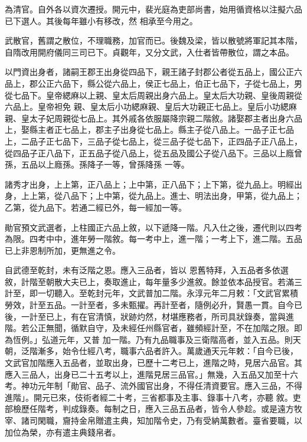 \begin{pinyinscope}
 為清官。自外各以資次遷授。開元中，裴光庭為吏部尚書，始用循資格以注擬六品已下選人。其後每年雖小有移改，然
 相承至今用之。



 武散官，舊謂之散位，不理職務，加官而已。後魏及梁，皆以散號將軍記其本階，自隋改用開府儀同三司已下。貞觀年，又分文武，入仕者皆帶散位，謂之本品。



 以門資出身者，諸嗣王郡王出身從四品下，親王諸子封郡公者從五品上，國公正六品上，郡公正六品下，縣公從六品上，侯正七品上，伯正七品下，子從七品上，男從七品下。皇帝緦麻以上親、皇太后周親出身六品上。皇太后大功親、皇後周親從六品上。皇帝袒免
 親、皇太后小功緦麻親、皇后大功親正七品上。皇后小功緦麻親、皇太子妃周親從七品上。其外戚各依服屬降宗親二階敘。諸娶郡主者出身六品上，娶縣主者正七品上，郡主子出身從七品上。縣主子從八品上。一品子正七品上，二品子正七品下，三品子從七品上，從三品子從七品下，正四品子正八品上，從四品子正八品下，正五品子從八品上，從五品及國公子從八品下。三品以上廕曾孫，五品以上廕孫。孫降子一等，曾孫降孫
 一等。



 諸秀才出身，上上第，正八品上；上中第，正八品下；上下第，從九品上。明經出身，上上第，從八品下；上中第，從九品上。進士、明法出身，甲第，從九品上；乙第，從九品下。若通二經已外，每一經加一等。



 勛官預文武選者，上柱國正六品上敘，以下遞降一階。凡入仕之後，遷代則以四考為限。四考中中，進年勞一階敘。每一考中上，進一階；一考上下，進二階。五品已上非恩制所加，更無進之令。



 自武德至乾封，未有泛階之恩。應入三品者，皆以
 恩舊特拜，入五品者多依選敘，計階至朝散大夫已上，奏取進止，每年量多少進敘。餘並依本品授官。若滿三計至，即一切聽入。至乾封元年，文武普加二階。永淳元年二月敕：「文武官累積勞效，計至五品。一計至者，多未甄擢。再計至者，隨例必升，賢愚一貫。自今已後，一計至已上，有在官清慎，狀跡灼然，材堪應務者，所司具狀錄奏，當與進階。若公正無聞，循默自守，及未經任州縣官者，雖頻經計至，不在加階之限。即為恆例。」弘道元年，又普
 加一階。乃有九品職事及三衛階高者，並入五品。則天朝，泛階漸多，始令仕經八考，職事六品者許入。萬歲通天元年敕：「自今已後，文武官加階應入五品者，並取出身，已歷十二考已上，進階之時，見居六品官。其應入三品人，出身已二十五考以上，進階見居三品官。」無幾，入五品又加至十六考。神功元年制「勛官、品子、流外國官出身，不得任清資要官。應入三品，不得進階」。開元已來，伎術者經二十考，三省都事及主事、錄事十八考，亦聽
 敘。吏部檢歷任階考，判成錄奏。每制之日，應入三品五品者，皆令人參趁。或是遠方牧宰、諸司閑職，齎持金帛贈遣主典，知加階令史，乃有受納萬數者。臺省要職，以加位為榮，亦有遣主典錢帛者。




\end{pinyinscope}
